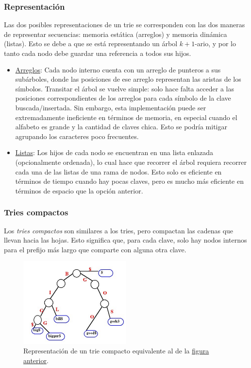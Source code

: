 \documentclass{article}
\begin{document}
    \subsubsection{Representación}

    Las dos posibles representaciones de un trie se corresponden con las dos maneras de representar secuencias: memoria estática (arreglos) y memoria dinámica (listas). Esto se debe a que se está representando un árbol ${k+1}$-ario, y por lo tanto cada nodo debe guardar una referencia a todos sus hijos.

    \begin{itemize}
        \item \underline{Arreglos}: Cada nodo interno cuenta con un arreglo de punteros a sus subárboles, donde las posiciones de ese arreglo representan las aristas de los símbolos. Transitar el árbol se vuelve simple: solo hace falta acceder a las posiciones correspondientes de los arreglos para cada símbolo de la clave buscada/insertada. Sin embargo, esta implementación puede ser extremadamente ineficiente en términos de memoria, en especial cuando el alfabeto es grande y la cantidad de claves chica. Esto se podría mitigar agrupando los caracteres poco frecuentes.
        \item \underline{Listas}: Los hijos de cada nodo se encuentran en una lista enlazada (opcionalmente ordenada), lo cual hace que recorrer el árbol requiera recorrer cada una de las listas de una rama de nodos. Esto solo es eficiente en términos de tiempo cuando hay pocas claves, pero es mucho más eficiente en términos de espacio que la opción anterior.
    \end{itemize}

    \subsubsection{Tries compactos}

    Los \textit{tries compactos} son similares a los tries, pero compactan las cadenas que llevan hacia las hojas. Esto significa que, para cada clave, solo hay nodos internos para el prefijo más largo que comparte con alguna otra clave.

    \begin{figure}[H]
        \centering
        \includegraphics[width=0.5\textwidth]{trie_compacto.png}
        \caption*{Representación de un trie compacto equivalente al de la \hyperref[fig-trie]{figura anterior}.}
    \end{figure}
\end{document}
